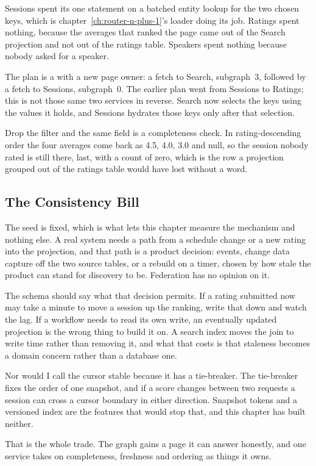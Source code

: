 Sessions spent its one statement on a batched entity lookup for the two chosen
keys, which is chapter~\ref{ch:router-n-plus-1}'s loader doing its job.
Ratings spent nothing, because the averages that ranked the page came out of
the Search projection and not out of the ratings table. Speakers spent nothing
because nobody asked for a speaker.

%
The plan is a  with a new page owner: a  fetch
to Search, subgraph~3, followed by a  fetch to Sessions,
subgraph~0. The earlier plan went from Sessions to Ratings; this is not those
same two services in reverse. Search now selects the keys using the values
it holds, and Sessions hydrates those keys only after that selection.

%
Drop the filter and the same field is a completeness check. In
rating-descending order the four averages come back as 4.5, 4.0, 3.0 and null,
so the session nobody rated is still there, last, with a count of zero, which
is the row a projection grouped out of the ratings table would have lost
without a word.
%

\subsection{The Consistency Bill}
\label{sec:ch13-consistency-bill}

%
The seed is fixed, which is what lets this chapter measure the mechanism and
nothing else. A real system needs a path from a schedule change or a new
rating into the projection, and that path is a product decision: events,
change data capture off the two source tables, or a rebuild on a timer,
chosen by how stale the product can stand for discovery to be. Federation has
no opinion on it.

%
The schema should say what that decision permits. If a rating submitted now
may take a minute to move a session up the ranking, write that down and watch
the lag. If a workflow needs to read its own write, an eventually updated
projection is the wrong thing to build it on. A search index moves the join
to write time rather than removing it, and what that costs is that staleness
becomes a domain concern rather than a database one.

%
Nor would I call the cursor stable because it has a tie-breaker. The
tie-breaker fixes the order of one snapshot, and if a score changes between
two requests a session can cross a cursor boundary in either direction.
Snapshot tokens and a versioned index are the features that would stop that,
and this chapter has built neither.

That is the whole trade. The graph gains a page it can answer honestly, and
one service takes on completeness, freshness and ordering as things it owns.
%
